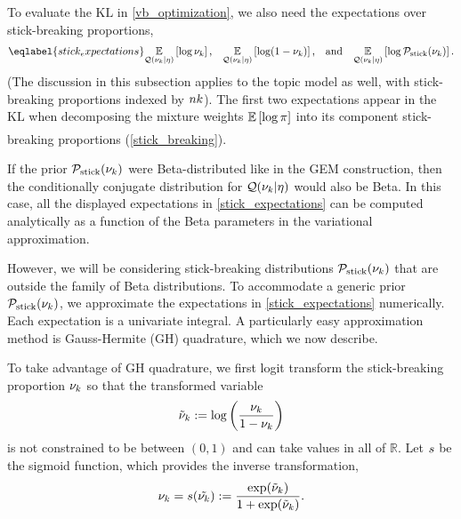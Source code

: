 To evaluate the $\mathrm{KL}$ in \eqref{vb_optimization}, we also need
the expectations over stick-breaking proportions,
\begin{align}\eqlabel{stick_expectations}
%
\expect{\q(\nuk \vert \eta)}{\log \nuk}
\textrm{,}\quad
\expect{\q(\nuk \vert \eta)}{\log (1 - \nuk)}
\textrm{,}\quad\textrm{and}\quad
\expect{\q(\nuk \vert \eta)}{\log \pstick(\nuk)}.
%
\end{align}
(The discussion in this subsection applies to the topic model as well,
with stick-breaking proportions indexed by $nk$).
The first two expectations appear in the $\mathrm{KL}$
when decomposing the mixture weights
$\underset{}{\mathbb{E}}\left[\log \pi\right]$ into its component stick-breaking proportions (\eqref{stick_breaking}).

If the prior $\mathcal{P}_{\mathrm{stick}}(\nu_{k})$ were Beta-distributed like in the GEM construction,
then the conditionally conjugate distribution for $\mathcal{Q}(\nu_{k} \vert \eta)$ would also be Beta.
In this case, all the displayed expectations in \eqref{stick_expectations}
can be computed analytically as a function of
the Beta parameters in the variational approximation.

However, we will be considering stick-breaking distributions $\mathcal{P}_{\mathrm{stick}}(\nu_{k})$ that
are outside the family of Beta distributions.
To accommodate a generic prior $\mathcal{P}_{\mathrm{stick}}(\nu_{k})$,
we approximate the expectations in \eqref{stick_expectations} numerically.
Each expectation is a univariate integral.
A particularly easy approximation method is
Gauss-Hermite (GH) quadrature, which we now describe.

To take advantage of GH quadrature, we first logit transform the stick-breaking
proportion $\nu_{k}$ so that the transformed variable
\begin{align*}
  \tilde{\nu}_{k} := \log\left(\frac{\nu_{k}}{1 - \nu_{k}}\right)
\end{align*}
is not constrained to be between $(0, 1)$ and can take values in all of $\mathbb{R}$.
Let $s$ be the sigmoid function,
which provides the inverse transformation,
\begin{align*}
  \nu_{k} = s(\tilde{\nu_{k}}) := \frac{\exp(\tilde{\nu}_k)}{1 + \exp(\tilde{\nu}_k)}.
\end{align*}

